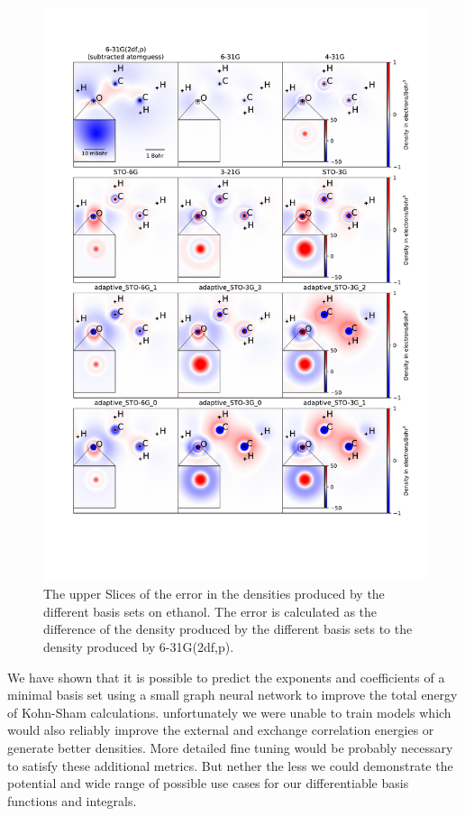 \begin{figure}
    \includegraphics[trim={2cm 4.5cm 1.0cm 3.cm},clip,width=1.\textwidth]{chapters/results/results_images/adaptive_basis_functions/adaptive_basis_set_slices}
    \caption{The upper Slices of the error in the densities produced by the different basis sets on ethanol. The error is calculated as the difference of the density produced by the different basis sets to the density produced by 6-31G(2df,p).} \label{fig:adaptive_basis_set_slices}
\end{figure}
\newpage
{}
We have shown that it is possible to predict the exponents and coefficients of a minimal basis set using a small graph neural network to improve the total energy of Kohn-Sham calculations.
unfortunately we were unable to train models which would also reliably improve the external and exchange correlation energies or generate better densities.
More detailed fine tuning would be probably necessary to satisfy these additional metrics.
But nether the less we could demonstrate the potential and wide range of possible use cases for our differentiable basis functions and integrals.














